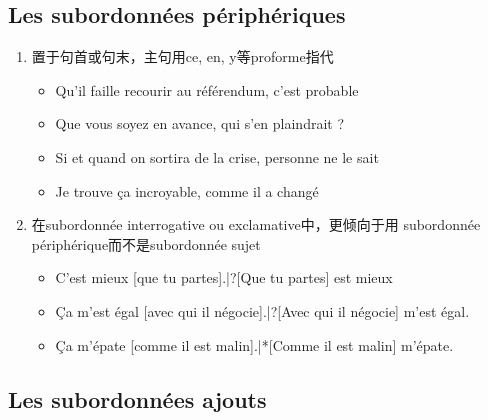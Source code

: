\documentclass[UTF8]{report}
\begin{document}
\subsection{Les subordonnées périphériques}
\begin{enumerate}
    \item 置于句首或句末，主句用ce, en, y等proforme指代
    \begin{itemize}
        \item Qu’il faille recourir au référendum, c’est probable
        \item Que vous soyez en avance, qui s’en plaindrait ?
        \item Si et quand on sortira de la crise, personne ne le sait
        \item Je trouve ça incroyable, comme il a changé
    \end{itemize}
    \item 在subordonnée interrogative ou exclamative中，更倾向于用 subordonnée périphérique而不是subordonnée sujet 
    \begin{itemize}
        \item C’est mieux [que tu partes].|?[Que tu partes] est mieux
        \item Ça m’est égal [avec qui il négocie].|?[Avec qui il négocie] m’est égal.
        \item Ça m’épate [comme il est malin].|*[Comme il est malin] m’épate.
    \end{itemize}
\end{enumerate}

\subsection{Les subordonnées ajouts}
\end{document}
